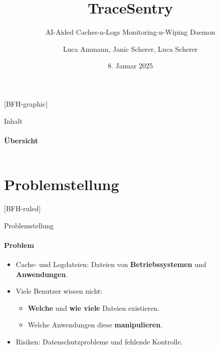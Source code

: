 \documentclass[
    ngerman,%
    authorontitle=true,
]{bfhbeamer}
\title{TraceSentry}
\subtitle{AI-Aided Caches-n-Logs Monitoring-n-Wiping Daemon}
\author[L. Ammann, J. Scherer, L. Scherer]{Luca Ammann, Janic Scherer, Luca Scherer}
\date{8. Januar 2025}
\institute{BFH-TI}
\begin{document}
    [BFH-graphic]
    \maketitle

    \begin{frame}{Inhalt}
        \framesubtitle{Übersicht}
        \begin{columns}
            \begin{column}{0.4\textwidth}
                \tableofcontents
            \end{column}
            \begin{column}{0.6\textwidth}
                \begin{center}
                \end{center}
            \end{column}
        \end{columns}
    \end{frame}


    \section{Problemstellung}\label{sec:problemstellung}
    [BFH-ruled]
    \frame{\sectionpage}

    \begin{frame}{Problemstellung}
        \framesubtitle{Problem}
        \begin{itemize}
            \item Cache- und Logdateien: Dateien von \textbf{Betriebssystemen} und \textbf{Anwendungen}.
            \item Viele Benutzer wissen nicht:
            \begin{itemize}
                \item \textbf{Welche} und \textbf{wie viele} Dateien existieren.
                \item Welche Anwendungen diese \textbf{manipulieren}.
            \end{itemize}
            \item Risiken: Datenschutzprobleme und fehlende Kontrolle.
        \end{itemize}
    \end{frame}
\end{document}
